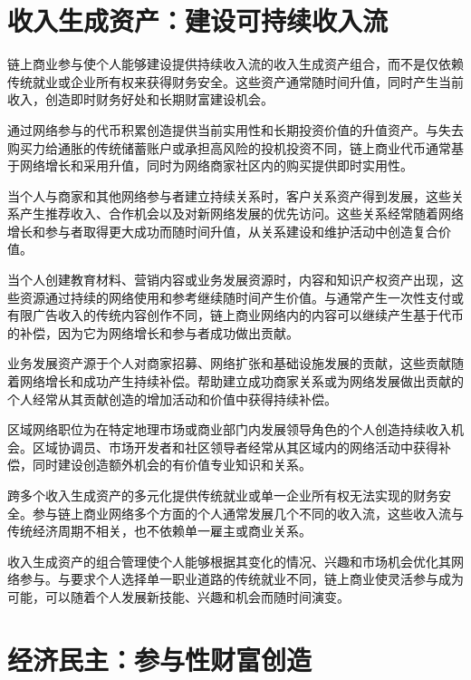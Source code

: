 \documentclass[
  Letterpaper,
]{scrbook}
\begin{document}
\section{收入生成资产：建设可持续收入流}\label{ux6536ux5165ux751fux6210ux8d44ux4ea7ux5efaux8bbeux53efux6301ux7eedux6536ux5165ux6d41}

链上商业参与使个人能够建设提供持续收入流的收入生成资产组合，而不是仅依赖传统就业或企业所有权来获得财务安全。这些资产通常随时间升值，同时产生当前收入，创造即时财务好处和长期财富建设机会。

通过网络参与的代币积累创造提供当前实用性和长期投资价值的升值资产。与失去购买力给通胀的传统储蓄账户或承担高风险的投机投资不同，链上商业代币通常基于网络增长和采用升值，同时为网络商家社区内的购买提供即时实用性。

当个人与商家和其他网络参与者建立持续关系时，客户关系资产得到发展，这些关系产生推荐收入、合作机会以及对新网络发展的优先访问。这些关系经常随着网络增长和参与者取得更大成功而随时间升值，从关系建设和维护活动中创造复合价值。

当个人创建教育材料、营销内容或业务发展资源时，内容和知识产权资产出现，这些资源通过持续的网络使用和参考继续随时间产生价值。与通常产生一次性支付或有限广告收入的传统内容创作不同，链上商业网络内的内容可以继续产生基于代币的补偿，因为它为网络增长和参与者成功做出贡献。

业务发展资产源于个人对商家招募、网络扩张和基础设施发展的贡献，这些贡献随着网络增长和成功产生持续补偿。帮助建立成功商家关系或为网络发展做出贡献的个人经常从其贡献创造的增加活动和价值中获得持续补偿。

区域网络职位为在特定地理市场或商业部门内发展领导角色的个人创造持续收入机会。区域协调员、市场开发者和社区领导者经常从其区域内的网络活动中获得补偿，同时建设创造额外机会的有价值专业知识和关系。

跨多个收入生成资产的多元化提供传统就业或单一企业所有权无法实现的财务安全。参与链上商业网络多个方面的个人通常发展几个不同的收入流，这些收入流与传统经济周期不相关，也不依赖单一雇主或商业关系。

收入生成资产的组合管理使个人能够根据其变化的情况、兴趣和市场机会优化其网络参与。与要求个人选择单一职业道路的传统就业不同，链上商业使灵活参与成为可能，可以随着个人发展新技能、兴趣和机会而随时间演变。

\section{经济民主：参与性财富创造}\label{ux7ecfux6d4eux6c11ux4e3bux53c2ux4e0eux6027ux8d22ux5bccux521bux9020}
\end{document}
